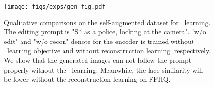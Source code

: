 \begin{figure}[t]
  \centering
  \texttt{[image: figs/exps/gen\_fig.pdf]}
  \caption{Qualitative comparisons on the self-augmented dataset for \editb \  learning. The editing prompt is "S* as a police, looking at the camera". "w/o edit" and "w/o recon" denote for the encoder is trained without \editb \ learning objective and without reconstruction learning, respectively. We show that the generated images can not follow the prompt properly without the \editb \ learning. Meanwhile, the face similarity will be lower without the reconstruction learning on FFHQ.}
  \label{fig:exp_self_aug}
\end{figure}